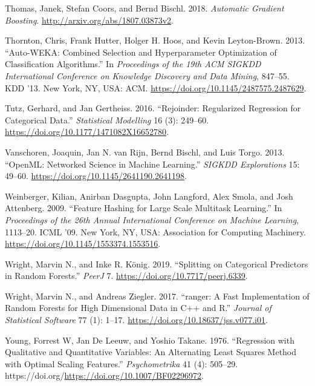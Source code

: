\documentclass[smallextended]{svjour3}       %
\newlength{\cslhangindent}
\newlength{\cslentryspacingunit} %
\newenvironment{CSLReferences}[2] %
 {%
  \setlength{\parindent}{0pt}
  \ifodd #1
  \let\oldpar\par
  \def\par{\hangindent=\cslhangindent\oldpar}
  \fi
  \setlength{\parskip}{#2\cslentryspacingunit}
 }%
 {}
\begin{document}
\begin{CSLReferences}{1}{0}
\leavevmode{}%
Thomas, Janek, Stefan Coors, and Bernd Bischl. 2018. \emph{Automatic Gradient Boosting}. \url{http://arxiv.org/abs/1807.03873v2}.

\leavevmode{}%
Thornton, Chris, Frank Hutter, Holger H. Hoos, and Kevin Leyton-Brown. 2013. {``Auto-WEKA: Combined Selection and Hyperparameter Optimization of Classification Algorithms.''} In \emph{Proceedings of the 19th ACM SIGKDD International Conference on Knowledge Discovery and Data Mining}, 847--55. KDD '13. New York, NY, USA: ACM. \url{https://doi.org/10.1145/2487575.2487629}.

\leavevmode{}%
Tutz, Gerhard, and Jan Gertheiss. 2016. {``Rejoinder: Regularized Regression for Categorical Data.''} \emph{Statistical Modelling} 16 (3): 249--60. \url{https://doi.org/10.1177/1471082X16652780}.

\leavevmode{}%
Vanschoren, Joaquin, Jan N. van Rijn, Bernd Bischl, and Luis Torgo. 2013. {``{OpenML}: Networked Science in Machine Learning.''} \emph{SIGKDD Explorations} 15: 49--60. \url{https://doi.org/10.1145/2641190.2641198}.

\leavevmode{}%
Weinberger, Kilian, Anirban Dasgupta, John Langford, Alex Smola, and Josh Attenberg. 2009. {``Feature Hashing for Large Scale Multitask Learning.''} In \emph{Proceedings of the 26th Annual International Conference on Machine Learning}, 1113--20. ICML '09. New York, NY, USA: Association for Computing Machinery. \url{https://doi.org/10.1145/1553374.1553516}.

\leavevmode{}%
Wright, Marvin N., and Inke R. König. 2019. {``Splitting on Categorical Predictors in Random Forests.''} \emph{PeerJ} 7. \url{https://doi.org/10.7717/peerj.6339}.

\leavevmode{}%
Wright, Marvin N., and Andreas Ziegler. 2017. {``{ranger}: A Fast Implementation of Random Forests for High Dimensional Data in {C++} and {R}.''} \emph{Journal of Statistical Software} 77 (1): 1--17. \url{https://doi.org/10.18637/jss.v077.i01}.

\leavevmode{}%
Young, Forrest W, Jan De Leeuw, and Yoshio Takane. 1976. {``Regression with Qualitative and Quantitative Variables: An Alternating Least Squares Method with Optimal Scaling Features.''} \emph{Psychometrika} 41 (4): 505--29. https://doi.org/\url{https://doi.org/10.1007/BF02296972}.

\end{CSLReferences}




\end{document}
